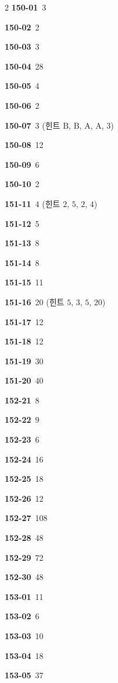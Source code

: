 \documentclass[10pt,a4paper]{article}
\newcommand{\pt}[1]{\mathrm{#1}}
\begin{document}
\begin{multicols}{2}
\noindent\textbf{150-01}\ 3\par
\noindent\textbf{150-02}\ 2\par
\noindent\textbf{150-03}\ 3\par
\noindent\textbf{150-04}\ 28\par
\noindent\textbf{150-05}\ 4\par
\noindent\textbf{150-06}\ 2\par
\noindent\textbf{150-07}\ 3 (힌트 $\pt{B}$, $\pt{B}$, $\pt{A}$, $\pt{A}$, $3$)\par
\noindent\textbf{150-08}\ 12\par
\noindent\textbf{150-09}\ 6\par
\noindent\textbf{150-10}\ 2\par
\noindent\textbf{151-11}\ 4 (힌트 $2$, $5$, $2$, $4$)\par
\noindent\textbf{151-12}\ 5\par
\noindent\textbf{151-13}\ 8\par
\noindent\textbf{151-14}\ 8\par
\noindent\textbf{151-15}\ 11\par
\noindent\textbf{151-16}\ 20 (힌트 $5$, $3$, $5$, $20$)\par
\noindent\textbf{151-17}\ 12\par
\noindent\textbf{151-18}\ 12\par
\noindent\textbf{151-19}\ 30\par
\noindent\textbf{151-20}\ 40\par
\noindent\textbf{152-21}\ 8\par
\noindent\textbf{152-22}\ 9\par
\noindent\textbf{152-23}\ 6\par
\noindent\textbf{152-24}\ 16\par
\noindent\textbf{152-25}\ 18\par
\noindent\textbf{152-26}\ 12\par
\noindent\textbf{152-27}\ 108\par
\noindent\textbf{152-28}\ 48\par
\noindent\textbf{152-29}\ 72\par
\noindent\textbf{152-30}\ 48\par
\noindent\textbf{153-01}\ 11\par
\noindent\textbf{153-02}\ 6\par
\noindent\textbf{153-03}\ 10\par
\noindent\textbf{153-04}\ 18\par
\noindent\textbf{153-05}\ 37\par

\end{multicols}
\end{document}
